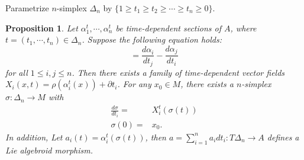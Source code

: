 \documentclass[12pt]{amsart}
\newtheorem{prop}[thm]{Proposition}
\theoremstyle{definition}
\theoremstyle{remark}
\numberwithin{equation}{section}
\newcommand{\del}{\partial}
\renewcommand{\del}{\partial}
\newcommand{\1}{{\mathbb{1}}}
\begin{document}
Parametrize $n$-simplex $\Delta_n$ by $\{1 \ge t_1\ge t_2 \ge \cdots \ge t_n \ge 0\}.$
\begin{prop}
Let $\alpha_1^t, \cdots, \alpha_n^t$ be time-dependent sections of $A$, where $t= (t_1, \cdots, t_n) \in \Delta_n$. Suppose the following equation holds:
\begin{equation}
    [\alpha_i, \alpha_j] = \frac{d \alpha_i}{d t_j} - \frac{d \alpha_j}{d t_i}
\end{equation}
for all $1\le i, j \le n$. Then there exists a family of time-dependent vector fields $X_i(x, t) = \rho(\alpha^t_i(x)) + \del t_i$. For any $x_0 \in M$, there exists a $n$-simplex $\sigma: \Delta_n \to M$ with
\begin{align*}
    \frac{d \sigma}{d t_i} =& X^t_i(\sigma(t))\\
    \sigma(0) =& x_0.
\end{align*}
In addition, Let $a_i(t) = \alpha_i^t(\sigma(t))$, then $a = \sum_{i=1}^n a_i dt_i: T\Delta_n \to A$ defines a Lie algebroid morphism.

\end{prop}
\end{document}
